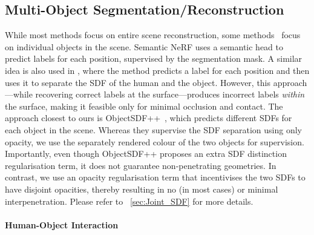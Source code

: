 \subsection{Multi-Object Segmentation/Reconstruction}
While most methods focus on entire scene reconstruction, some methods~\cite{Zhi2021semanticnerf, wu2022object, Wu2023objectsdfplus} focus on individual objects in the scene. 
Semantic NeRF \cite{Zhi2021semanticnerf} uses a semantic head to predict labels for each position, supervised by the segmentation mask.
A similar idea is also used in \cite{huang2022hhor}, where the method predicts a label for each position and then uses it to separate the SDF of the human and the object. 
However, this approach---while recovering correct labels at the surface---produces incorrect labels \textit{within} the surface, making it feasible only for minimal occlusion and contact. 
The approach closest to ours is  ObjectSDF++~\cite{Wu2023objectsdfplus}, which predicts different SDFs for each object in the scene. 
Whereas they supervise the SDF separation using only opacity, we use the separately rendered colour of the two objects for supervision. 
Importantly, even though ObjectSDF++ proposes an extra SDF distinction regularisation term, it does not guarantee non-penetrating geometries. 
In contrast, we use an opacity regularisation term that incentivises the two SDFs to have disjoint opacities, thereby resulting in no (in most cases) or minimal interpenetration. 
Please refer to ~\cref{sec:Joint_SDF} for more details. 

\paragraph{Human-Object Interaction}


